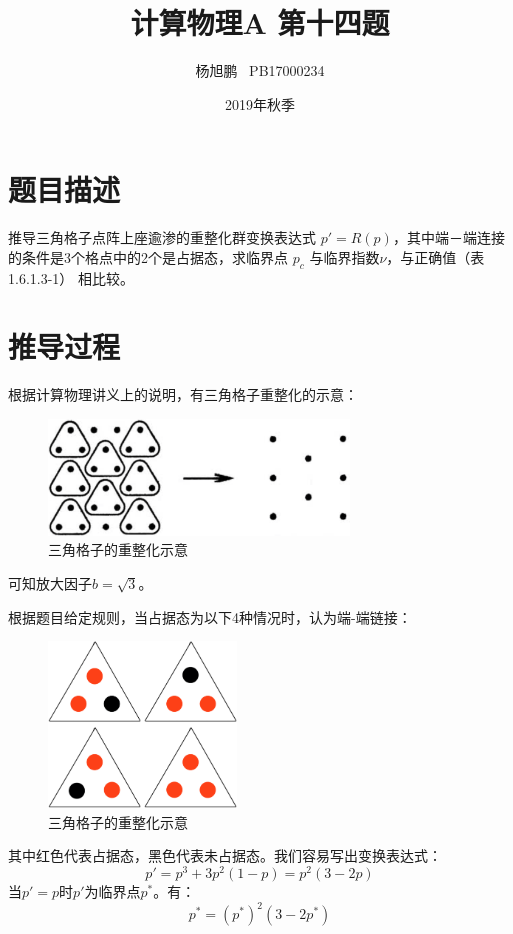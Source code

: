 \documentclass[a4paper,11pt]{article}
\author{ 杨旭鹏  \  PB17000234}
\date{2019年秋季}
\title{计算物理A 第十四题}
\begin{document}
\maketitle

\section{题目描述}
推导三角格子点阵上座逾渗的重整化群变换表达式 $p'= R(p)$，其中端－端连接的条件是3个格点中的2个是占据态，求临界点 $p_{c}$ 与临界指数$\nu$，与正确值（表1.6.1.3-1） 相比较。


\section{推导过程}
根据计算物理讲义上的说明，有三角格子重整化的示意：
\begin{figure}[!htbp]
\centering
\includegraphics[width = 8cm]{lattice.png}
\caption{三角格子的重整化示意}
\end{figure}

可知放大因子$b=\sqrt{3}$。


根据题目给定规则，当占据态为以下4种情况时，认为端-端链接：
\begin{figure}[!htbp]
\centering
\includegraphics[width = 5cm]{occupy.png}
\caption{三角格子的重整化示意}
\end{figure}

其中红色代表占据态，黑色代表未占据态。我们容易写出变换表达式：
\begin{equation}
	p' = p^{3}+3p^{2}(1-p) = p^{2}(3-2p)
\end{equation}
\newline 当$p'= p$时$p'$为临界点$p^{*}$。有：
\begin{equation}
	p^{*} = (p^{*})^{2}(3-2p^{*})
\end{equation}
\end{document}
